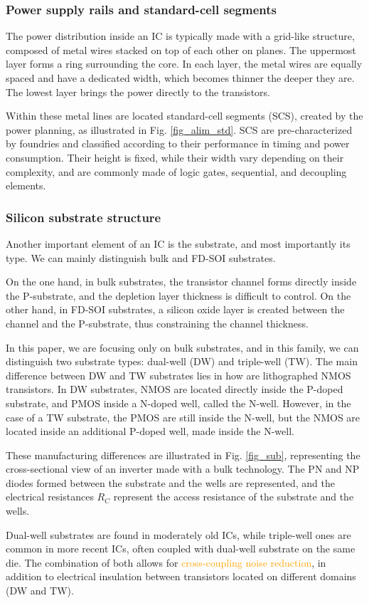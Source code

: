 		\subsubsection{Power supply rails and standard-cell segments}
		
		The power distribution inside an IC is typically made with a grid-like structure, composed of metal wires stacked on top of each other on planes.
		The uppermost layer forms a ring surrounding the core.
		In each layer, the metal wires are equally spaced and have a dedicated width, which becomes thinner the deeper they are.
		The lowest layer brings the power directly to the transistors.
		
		Within these metal lines are located standard-cell segments (SCS), created by the power planning, as illustrated in Fig. \ref{fig_alim_std}.
		SCS are pre-characterized by foundries and classified according to their performance in timing and power consumption.
		Their height is fixed, while their width vary depending on their complexity, and are commonly made of logic gates, sequential, and decoupling elements.
	
		\subsubsection{Silicon substrate structure}
		Another important element of an IC is the substrate, and most importantly its type.
		We can mainly distinguish bulk and FD-SOI substrates.
		
		On the one hand, in bulk substrates, the transistor channel forms directly inside the P-substrate, and the depletion layer thickness is difficult to control.
		On the other hand, in FD-SOI substrates, a silicon oxide layer is created between the channel and the P-substrate, thus constraining the channel thickness.
		
		In this paper, we are focusing only on bulk substrates, and in this family, we can distinguish two substrate types: dual-well (DW) and triple-well (TW).
		The main difference between DW and TW substrates lies in how are lithographed NMOS transistors.
		In DW substrates, NMOS are located directly inside the P-doped substrate, and PMOS inside a N-doped well, called the N-well.
		However, in the case of a TW substrate, the PMOS are still inside the N-well, but the NMOS are located inside an additional P-doped well, made inside the N-well.
		
		These manufacturing differences are illustrated in Fig. \ref{fig_sub}, representing the cross-sectional view of an inverter made with a bulk technology.
		The PN and NP diodes formed between the substrate and the wells are represented, and the electrical resistances $R_C$ represent the access resistance of the substrate and the wells.
		
		Dual-well substrates are found in moderately old ICs, while triple-well ones are common in more recent ICs, often coupled with dual-well substrate on the same die.
		The combination of both allows for \textcolor{orange}{cross-coupling noise reduction}, in addition to electrical insulation between transistors located on different domains (DW and TW).

